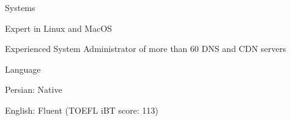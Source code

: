 \begin{cventries}
  \cventryshortlist
    {Systems}
    {
      \begin{cvitems}
        \item {Expert in Linux and MacOS}
        \item {Experienced System Administrator of more than 60 DNS and CDN servers}
      \end{cvitems}
    }

  \cventryshortlist
    {Language}
    {
      \begin{cvitems}
        \item {Persian: Native}
        \item {English: Fluent (TOEFL iBT score: 113)}
      \end{cvitems}
    }

\end{cventries}

